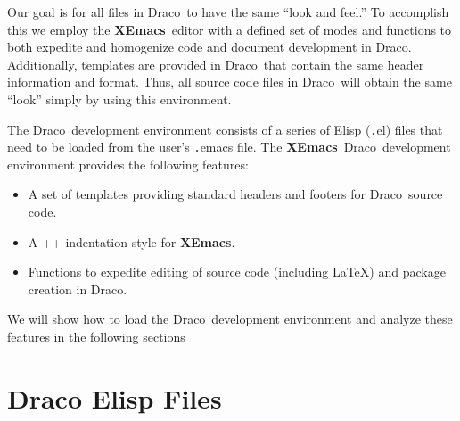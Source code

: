 \documentclass[11pt]{nmemo}
\newcommand{\comp}[1]{{\normalfont\texttt#1}}
\newcommand{\draco}{{\normalfont\sffamily Draco}}
\newcommand{\xemacs}{{\normalfont\bfseries XEmacs}}
\begin{document}
Our goal is for all files in \draco\ to have the same ``look and
feel.''  To accomplish this we employ the \xemacs\ editor with a
defined set of modes and functions to both expedite and homogenize
code and document development in \draco.  Additionally, templates are
provided in \draco\ that contain the same header information and
format.  Thus, all source code files in \draco\ will obtain the same
``look'' simply by using this environment.

The \draco\ development environment consists of a series of Elisp
(\comp{.el}) files that need to be loaded from the user's
\comp{.emacs} file.  The \xemacs\ \draco\ development environment
provides the following features:
\begin{itemize}
\item A set of templates providing standard headers and footers for
  \draco\ source code.
\item A \C++ indentation style for \xemacs.
\item Functions to expedite editing of source code (including \LaTeX)
   and package creation in \draco.
\end{itemize}
We will show how to load the \draco\ development environment and
analyze these features in the following sections


\section{Draco Elisp Files}
\end{document}
